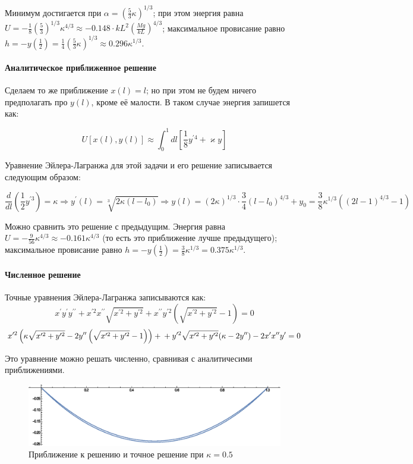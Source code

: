 \documentclass[a4paper,12pt]{article}
\begin{document}
\noindent
Минимум достигается при $\alpha=\left(\frac{5}{3}\kappa\right)^{1/3}$;
при этом энергия равна $U=-\frac{1}{8}\left(\frac{5}{3}\right)^{1/3}\kappa{}^{4/3}\approx-0.148\cdot kL^{2}\left(\frac{Mg}{kL}\right)^{4/3}$;
максимальное провисание равно $h=-y(\frac{1}{2})=\frac{1}{4}\left(\frac{5}{3}\kappa\right)^{1/3}\approx0.296\kappa^{1/3}$.


\paragraph{Аналитическое приближенное решение}

Сделаем то же приближение $x(l)=l$; но при этом не будем ничего предполагать
про $y(l)$, кроме её малости. В таком случае энергия запишется как:

\[
U[x(l),y(l)]\approx\int_{0}^{1}dl\left[\frac{1}{8}y^{\prime4}+\varkappa y\right]
\]

\noindent
Уравнение Эйлера-Лагранжа для этой задачи и его решение записывается
следующим образом:

\[
\frac{d}{dl}\left(\frac{1}{2}y^{\prime3}\right)=\kappa\Rightarrow y^{\prime}(l)=\sqrt[3]{2\kappa(l-l_{0})}
\Rightarrow
y(l)=(2\kappa)^{1/3}\cdot\frac{3}{4}(l-l_{0})^{4/3}+y_{0}=\frac{3}{8}\kappa^{1/3}\left((2l-1)^{4/3}-1\right)
\]

\noindent
Можно сравнить это решение с предыдущим. Энергия равна $U=-\frac{9}{56}\kappa^{4/3}\approx-0.161\kappa^{4/3}$
(то есть это приближение лучше предыдущего); максимальное провисание
равно $h=-y(\frac{1}{2})=\frac{3}{8}\kappa^{1/3}=0.375\kappa^{1/3}$.


\paragraph{Численное решение}

Точные уравнения Эйлера-Лагранжа записываются как:
\[
x^{\prime}y^{\prime}y^{\prime\prime}+x^{\prime2}x^{\prime\prime}\sqrt{x^{\prime2}+y^{\prime2}}+x^{\prime\prime}y^{\prime2}\left(\sqrt{x^{\prime2}+y^{\prime2}}-1\right) =0
\]
\[
x^{\prime2}\left(\kappa\sqrt{x^{\prime2}+y^{\prime2}}-2y^{\prime\prime}\left(\sqrt{x^{\prime2}+y^{\prime2}}-1\right)\right)+\\
+y^{\prime2}\sqrt{x^{\prime2}+y^{\prime2}}(\kappa-2y^{\prime\prime})-2x^{\prime}x^{\prime\prime}y^{\prime} =0
\]

\noindent
Это уравнение можно решать численно, сравнивая с аналитичесими приближениями.

\begin{figure}[h]
\caption{Приближение к решению и точное решение при $\kappa=0.5$}
\centering
\includegraphics[width=0.8\columnwidth]{static.eps}
\end{figure}
\end{document}
